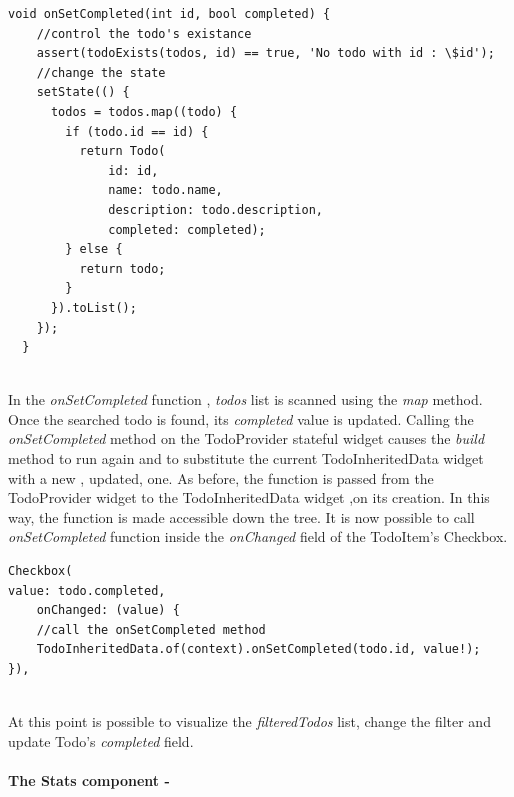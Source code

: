 \begin{code}
\mbox{}
\label{code:2.27}
\begin{verbatim}
void onSetCompleted(int id, bool completed) {
    //control the todo's existance
    assert(todoExists(todos, id) == true, 'No todo with id : \$id');
    //change the state
    setState(() {
      todos = todos.map((todo) {
        if (todo.id == id) {
          return Todo(
              id: id,
              name: todo.name,
              description: todo.description,
              completed: completed);
        } else {
          return todo;
        }
      }).toList();
    });
  }
\end{verbatim}
\end{code}
\mbox{}\\
In the \textit{onSetCompleted }function , \textit{todos }list is scanned using the \textit{map }method. Once the searched todo is found, its \textit{completed }value is updated. Calling the \textit{onSetCompleted }method on the TodoProvider stateful widget causes the \textit{build}  method to run again and to substitute the current TodoInheritedData widget with a new , updated, one. As before, the function is passed from the TodoProvider widget to the TodoInheritedData widget ,on its creation. In this way, the function is made accessible down the tree. It is now possible to call \textit{onSetCompleted} function inside the \textit{onChanged} field of the TodoItem's Checkbox.
\mbox{}\\
\begin{code}
\mbox{}
\label{code:2.28}
\begin{verbatim}
Checkbox(
value: todo.completed,
    onChanged: (value) {
    //call the onSetCompleted method
    TodoInheritedData.of(context).onSetCompleted(todo.id, value!);
}),
\end{verbatim}
\end{code}
\mbox{}\\
At this point is possible to visualize the \textit{filteredTodos} list, change the filter and update Todo’s \textit{completed }field.


\paragraph{The Stats component - }
\label{subpar:todo_app_inherited_widget_stats_component}

